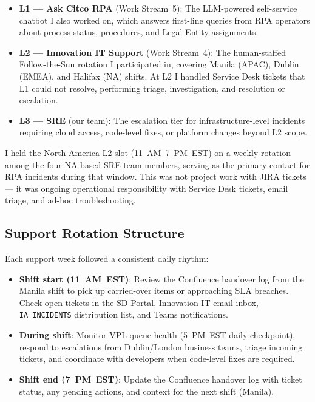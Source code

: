 \begin{itemize}
    \item \textbf{L1 --- Ask Citco RPA} (Work Stream~5): The LLM-powered
          self-service chatbot I also worked on, which answers first-line queries from RPA
          operators about process status, procedures, and Legal Entity assignments.
    \item \textbf{L2 --- Innovation IT Support} (Work Stream~4): The
          human-staffed Follow-the-Sun rotation I participated in, covering Manila (APAC),
          Dublin (EMEA), and Halifax (NA) shifts. At L2 I handled Service Desk
          tickets that L1 could not resolve, performing triage, investigation,
          and resolution or escalation.
    \item \textbf{L3 --- SRE} (our team): The escalation tier for
          infrastructure-level incidents requiring cloud access, code-level
          fixes, or platform changes beyond L2 scope.
\end{itemize}

I held the North America L2 slot (11~AM--7~PM~EST) on a weekly rotation among the four
NA-based SRE team members, serving as the primary contact for RPA incidents during that window. This was
not project work with JIRA tickets --- it was ongoing operational
responsibility with Service Desk tickets, email triage, and ad-hoc troubleshooting.

\subsection{Support Rotation Structure}

Each support week followed a consistent daily rhythm:

\begin{itemize}
    \item \textbf{Shift start (11~AM~EST)}: Review the Confluence handover
          log from the Manila shift to pick up carried-over items or
          approaching SLA breaches. Check open tickets in the SD Portal,
          Innovation IT email inbox, \texttt{IA\_INCIDENTS} distribution
          list, and Teams notifications.

    \item \textbf{During shift}: Monitor VPL queue health (5~PM~EST daily
          checkpoint), respond to escalations from Dublin/London business
          teams, triage incoming tickets, and coordinate with developers
          when code-level fixes are required.

    \item \textbf{Shift end (7~PM~EST)}: Update the Confluence handover log
          with ticket status, any pending actions, and context for the
          next shift (Manila).
\end{itemize}

